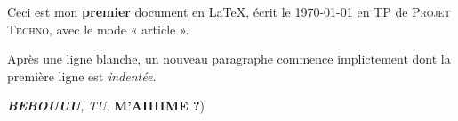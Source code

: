 \documentclass[a4paper,12pt]{article}
\begin{document}
Ceci est mon \textbf{premier} document en \LaTeX, écrit le \today{} en TP de
\textsc{Projet Techno}, avec le mode « article ».

Après une ligne {\Huge blanche}, un nouveau paragraphe commence implictement dont la
première ligne est \emph{indentée}.

\textbf{\emph{BEBOUUU}}, \textsf{\emph{TU}}, \textsf{\textbf{M'AIIIIME ?}})
\end{document}
